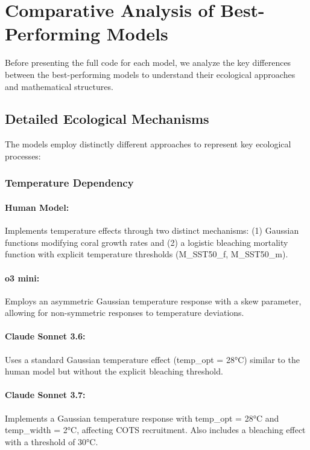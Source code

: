 
\section{Comparative Analysis of Best-Performing Models}
\label{sec:model_comparison}

Before presenting the full code for each model, we analyze the key differences between the best-performing models to understand their ecological approaches and mathematical structures.



\subsection{Detailed Ecological Mechanisms}
\label{subsec:ecological_mechanisms}

The models employ distinctly different approaches to represent key ecological processes:

\subsubsection{Temperature Dependency}
\label{subsubsec:temperature_dependency}

\paragraph{Human Model:} Implements temperature effects through two distinct mechanisms: (1) Gaussian functions modifying coral growth rates and (2) a logistic bleaching mortality function with explicit temperature thresholds (M\_SST50\_f, M\_SST50\_m).

\paragraph{o3 mini:} Employs an asymmetric Gaussian temperature response with a skew parameter, allowing for non-symmetric responses to temperature deviations.

\paragraph{Claude Sonnet 3.6:} Uses a standard Gaussian temperature effect (temp\_opt = 28°C) similar to the human model but without the explicit bleaching threshold.

\paragraph{Claude Sonnet 3.7:} Implements a Gaussian temperature response with temp\_opt = 28°C and temp\_width = 2°C, affecting COTS recruitment. Also includes a bleaching effect with a threshold of 30°C.

